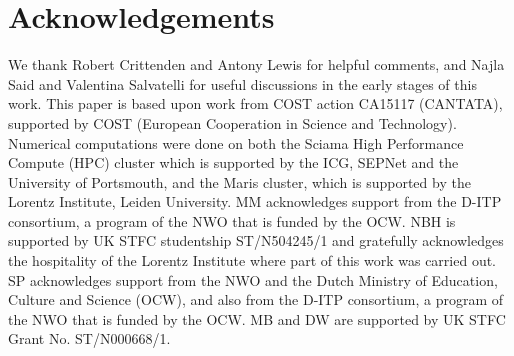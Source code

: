 \documentclass[a4paper,fleqn,usenatbib]{mnras}
\begin{document}
\section*{Acknowledgements}
We thank Robert Crittenden and Antony Lewis for helpful comments, and Najla Said and Valentina Salvatelli for useful discussions in the early stages of this work. This paper is based upon work from COST action CA15117 (CANTATA), supported by COST (European Cooperation in Science and Technology). Numerical computations were done on both the Sciama High Performance Compute (HPC) cluster which is supported by the ICG, SEPNet and the University of Portsmouth, and the Maris cluster, which is supported by the Lorentz Institute, Leiden University. MM acknowledges support from the D-ITP consortium, a program of the NWO that is funded by the OCW. NBH is supported by UK STFC studentship ST/N504245/1 and gratefully acknowledges the hospitality of the Lorentz Institute where part of this work was carried out. SP acknowledges support from the NWO and the Dutch Ministry of Education, Culture and Science (OCW), and also from the D-ITP consortium, a program of the NWO that is funded by the OCW.
MB and DW are supported by UK STFC Grant No. ST/N000668/1.











\bsp	%
\label{lastpage}
\end{document}

